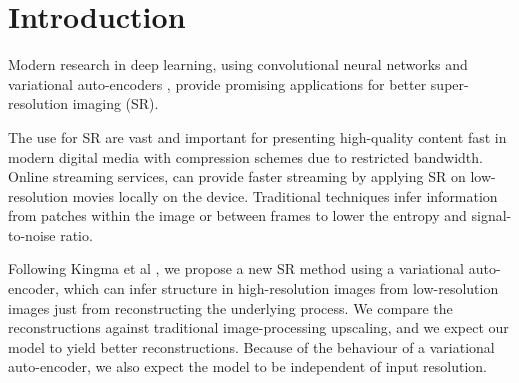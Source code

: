 \section{Introduction}
\label{sec:introduction}

Modern research in deep learning, using convolutional neural networks \cite{Dong15} and variational auto-encoders \cite{Kingma2013, Johnson16}, provide promising applications for better super-resolution imaging (SR).

The use for SR are vast and important for presenting high-quality content fast in modern digital media with compression schemes due to restricted bandwidth.
Online streaming services, can provide faster streaming by applying SR on low-resolution movies locally on the device.
Traditional techniques infer information from patches within the image or between frames to lower the entropy and signal-to-noise ratio. 


Following Kingma et al \cite{Kingma2013}, we propose a new SR method using a variational auto-encoder, which can infer structure in high-resolution images from low-resolution images just from reconstructing the underlying process. We compare the reconstructions against traditional image-processing upscaling, and we expect our model to yield better reconstructions. Because of the behaviour of a variational auto-encoder, we also expect the model to be independent of input resolution.
